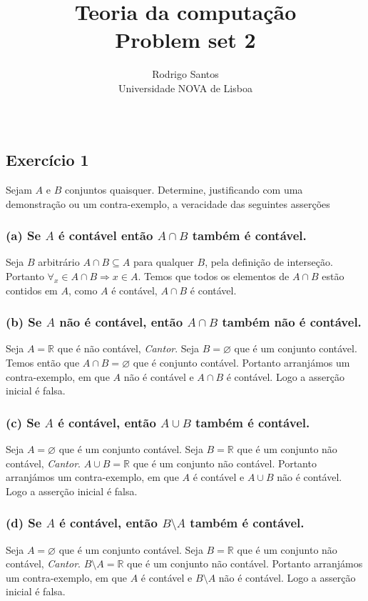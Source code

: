 \documentclass{article}
\title{Teoria da computação \large \\ Problem set 2}
\author{Rodrigo Santos\\
  \small Universidade NOVA de Lisboa\\\\
}
\date{\vspace{-5ex}}
\begin{document}
\maketitle
\subsection*{Exercício 1}
Sejam $A$ e $B$ conjuntos quaisquer. Determine, justificando com uma demonstração ou um contra-exemplo, a veracidade das seguintes asserções

\subsubsection*{(a) Se $A$ é contável então $A \cap B$ também é contável.}
Seja $B$ arbitrário $A \cap B \subseteq A$ para qualquer $B$, pela definição de interseção. Portanto $\forall_x \in A \cap B \Rightarrow x \in A$. Temos que todos os elementos de $A \cap B$ estão contidos em $A$, como $A$ é contável, $A \cap B$ é contável.

\subsubsection*{(b) Se $A$ não é contável, então $A \cap B$ também não é contável.}
Seja $A = \mathbb{R}$ que é não contável, \textit{Cantor}. Seja $B = \varnothing$ que é um conjunto contável. Temos então que $A \cap B = \varnothing$ que é conjunto contável. Portanto arranjámos um contra-exemplo, em que $A$ não é contável e $A \cap B$ é contável. Logo a asserção inicial é falsa.

\subsubsection*{(c) Se $A$ é contável, então $A \cup B$ também é contável.}
Seja $A = \varnothing$ que é um conjunto contável. Seja $B = \mathbb{R}$ que é um conjunto não contável, \textit{Cantor}. $A \cup B = \mathbb{R}$ que é um conjunto não contável. Portanto arranjámos um contra-exemplo, em que $A$ é contável e $A \cup B$ não é contável. Logo a asserção inicial é falsa.

\subsubsection*{(d) Se $A$ é contável, então $B \setminus A$ também é contável.}
Seja $A = \varnothing$ que é um conjunto contável. Seja $B = \mathbb{R}$ que é um conjunto não contável, \textit{Cantor}. $B \setminus A = \mathbb{R}$ que é um conjunto não contável. Portanto arranjámos um contra-exemplo, em que $A$ é contável e $B \setminus A$ não é contável. Logo a asserção inicial é falsa.
\end{document}
